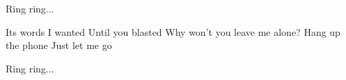 \documentclass[../../../songbook.tex]{subfiles}
\begin{document}
\-\hspace{1cm} Ring ring...		\newline

Its words I wanted					 \newline
Until you blasted					 \newline
Why won’t you leave me alone?		 \newline
Hang up the phone					 \newline
Just let me go						 \newline
  
\-\hspace{1cm} Ring ring...
\end{document}
